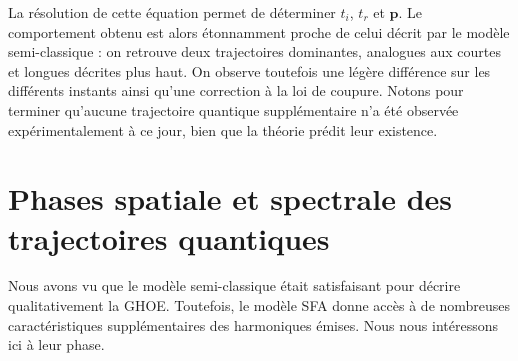 La résolution de cette équation permet de déterminer $t_i$, $t_r$ et $\bm{p}$. Le comportement obtenu est alors étonnamment proche de celui décrit par le modèle semi-classique : on retrouve deux trajectoires dominantes, analogues aux courtes et longues décrites plus haut. On observe toutefois une légère différence sur les différents instants ainsi qu'une correction à la loi de coupure. Notons pour terminer qu'aucune trajectoire quantique supplémentaire n'a été observée expérimentalement à ce jour, bien que la théorie prédit leur existence.

\section{Phases spatiale et spectrale des trajectoires quantiques}
\label{sec:thTraj}
Nous avons vu que le modèle semi-classique était satisfaisant pour décrire qualitativement la GHOE. Toutefois, le modèle SFA donne accès à de nombreuses caractéristiques supplémentaires des harmoniques émises. Nous nous intéressons ici à leur phase. 

